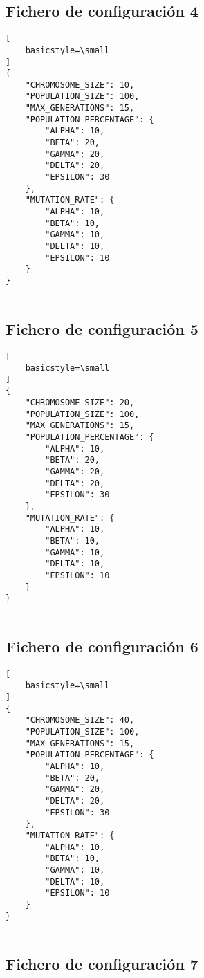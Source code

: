 \subsection{Fichero de configuración 4} \label{subsect:config_file_4}
\begin{lstlisting}[
    basicstyle=\small
]
{
    "CHROMOSOME_SIZE": 10,
    "POPULATION_SIZE": 100,
    "MAX_GENERATIONS": 15,
    "POPULATION_PERCENTAGE": {
        "ALPHA": 10,
        "BETA": 20,
        "GAMMA": 20,
        "DELTA": 20,
        "EPSILON": 30
    },
    "MUTATION_RATE": {
        "ALPHA": 10,
        "BETA": 10,
        "GAMMA": 10,
        "DELTA": 10,
        "EPSILON": 10
    }
}
   
\end{lstlisting}

\subsection{Fichero de configuración 5} \label{subsect:config_file_5}

\begin{lstlisting}[
    basicstyle=\small
]
{
    "CHROMOSOME_SIZE": 20,
    "POPULATION_SIZE": 100,
    "MAX_GENERATIONS": 15,
    "POPULATION_PERCENTAGE": {
        "ALPHA": 10,
        "BETA": 20,
        "GAMMA": 20,
        "DELTA": 20,
        "EPSILON": 30
    },
    "MUTATION_RATE": {
        "ALPHA": 10,
        "BETA": 10,
        "GAMMA": 10,
        "DELTA": 10,
        "EPSILON": 10
    }
}
   
\end{lstlisting}

\subsection{Fichero de configuración 6} \label{subsect:config_file_6}

\begin{lstlisting}[
    basicstyle=\small
]
{
    "CHROMOSOME_SIZE": 40,
    "POPULATION_SIZE": 100,
    "MAX_GENERATIONS": 15,
    "POPULATION_PERCENTAGE": {
        "ALPHA": 10,
        "BETA": 20,
        "GAMMA": 20,
        "DELTA": 20,
        "EPSILON": 30
    },
    "MUTATION_RATE": {
        "ALPHA": 10,
        "BETA": 10,
        "GAMMA": 10,
        "DELTA": 10,
        "EPSILON": 10
    }
}
   
\end{lstlisting}

\subsection{Fichero de configuración 7} \label{subsect:config_file_7}

